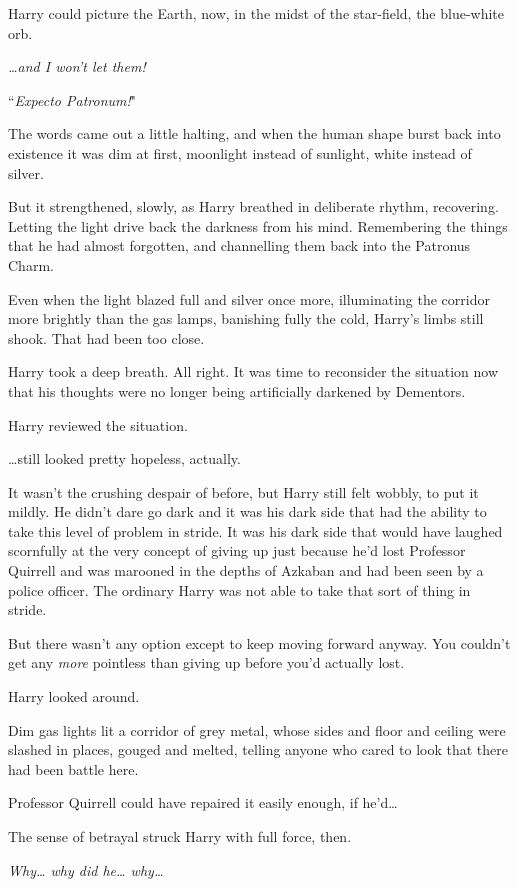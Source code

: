 Harry could picture the Earth, now, in the midst of the star-field, the blue-white orb.

\emph{{\ldots}and I won't let them!}

``\emph{Expecto Patronum!}"

The words came out a little halting, and when the human shape burst back into existence it was dim at first, moonlight instead of sunlight, white instead of silver.

But it strengthened, slowly, as Harry breathed in deliberate rhythm, recovering. Letting the light drive back the darkness from his mind. Remembering the things that he had almost forgotten, and channelling them back into the Patronus Charm.

Even when the light blazed full and silver once more, illuminating the corridor more brightly than the gas lamps, banishing fully the cold, Harry's limbs still shook. That had been too close.

Harry took a deep breath. All right. It was time to reconsider the situation now that his thoughts were no longer being artificially darkened by Dementors.

Harry reviewed the situation.

{\ldots}still looked pretty hopeless, actually.

It wasn't the crushing despair of before, but Harry still felt wobbly, to put it mildly. He didn't dare go dark and it was his dark side that had the ability to take this level of problem in stride. It was his dark side that would have laughed scornfully at the very concept of giving up just because he'd lost Professor Quirrell and was marooned in the depths of Azkaban and had been seen by a police officer. The ordinary Harry was not able to take that sort of thing in stride.

But there wasn't any option except to keep moving forward anyway. You couldn't get any \emph{more} pointless than giving up before you'd actually lost.

Harry looked around.

Dim gas lights lit a corridor of grey metal, whose sides and floor and ceiling were slashed in places, gouged and melted, telling anyone who cared to look that there had been battle here.

Professor Quirrell could have repaired it easily enough, if he'd{\ldots}

The sense of betrayal struck Harry with full force, then.

\emph{Why{\ldots} why did he{\ldots} why{\ldots}}


